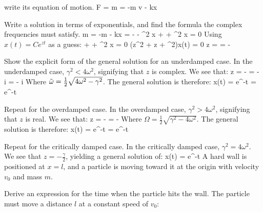 write its equation of motion.
\be
F = m = -m \gamma v - kx
\ee
\item Write a solution in terms of exponentials, and find the formula the complex frequencies must
satisfy.
\be
m = -m \gamma {} - kx \thus {} = - \gamma {} - \omega^2 x \thus {} + \gamma {} + \omega^2 x = 0
\ee
Using $x(t) = Ce^{zt}$ as a guess:
\be
{} + \gamma {} + \omega^2 x = 0 \thus \left(z^2 + \gamma z + \omega^2\right)x(t) = 0
\ee
\be
z =  = - \pm {}
\ee
\item Show the explicit form of the general solution for an underdamped case.
\newline In the underdamped case, $\gamma^2 < 4\omega^2$, signifying that $z$ is complex. We see that:
\be
z = - \pm {} = - \pm {}i = - \pm i \Tilde{\omega}
\ee
Where $\Tilde{\omega} = \frac{1}{2}\sqrt{4\omega^2 - \gamma^2}$. The general solution is therefore:
\be
x(t) = e^{-t}  = e^{-t}  
\ee
\item Repeat for the overdamped case.
\newline In the overdamped case, $\gamma^2 > 4\omega^2$, signifying that $z$ is real. We see that:
\be
z = - \pm {} = - \pm \Omega
\ee
Where $\Omega = \frac{1}{2}\sqrt{\gamma^2 - 4\omega^2}$. The general solution is therefore:
\be
x(t) = e^{-t}  = e^{-t}  
\ee
\item Repeat for the critically damped case.
\newline In the critically damped case, $\gamma^2 = 4\omega^2$. We see that $z = -\frac{\gamma}{2}$, yielding a general solution of:
\be
x(t) = e^{-t} \left[A + Bt\right]
\ee
\enu
\newpage
{}
A hard wall is positioned at $x=l$, and a particle is moving toward it at the
origin with velocity $v_0$ and mass $m$.
\benu
\item Derive an expression for the time when the particle hits the wall.
\newline The particle must move a distance $l$ at a constant speed of $v_0$:
